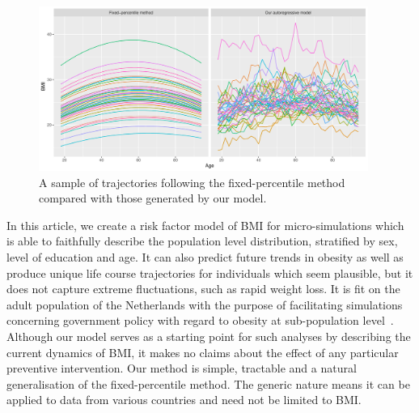 \documentclass{imammb}
\numberwithin{equation}{section}
\begin{document}
\vspace{-4mm}

\begin{figure}[!h]
\centering
\includegraphics[width=0.96\textwidth] {"Figures/Individual Trajectories.pdf"}
\vspace*{-2pt}
\caption{A sample of trajectories following the fixed-percentile method compared with those generated by our model.}
\label{fig:Individual Trajectories}
\vspace*{-9pt}
\end{figure}

\vspace{1mm}

In this article, we create a risk factor model of BMI for micro-simulations which is able to faithfully describe the population level distribution, stratified by sex, level of education and age. It can also predict future trends in obesity as well as produce unique life course trajectories for individuals which seem plausible, but it does not capture extreme fluctuations, such as rapid weight loss. It is fit on the adult population of the Netherlands with the purpose of facilitating simulations concerning government policy with regard to obesity at sub-population level~\citep{TenDam2023}. Although our model serves as a starting point for such analyses by describing the current dynamics of BMI, it makes no claims about the effect of any particular preventive intervention. Our method is simple, tractable and a natural generalisation of the fixed-percentile method. The generic nature means it can be applied to data from various countries and need not be limited to BMI.
\end{document}
